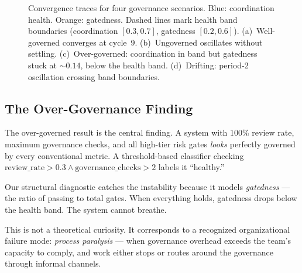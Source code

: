 \documentclass[sigconf,nonacm]{acmart}
\begin{document}
\begin{figure}[t]
  \caption{Convergence traces for four governance scenarios. Blue:
    coordination health. Orange: gatedness. Dashed lines mark health band
    boundaries (coordination $[0.3, 0.7]$, gatedness $[0.2, 0.6]$).
    (a)~Well-governed converges at cycle~9. (b)~Ungoverned oscillates
    without settling. (c)~Over-governed: coordination in band but gatedness
    stuck at ${\sim}0.14$, below the health band. (d)~Drifting: period-2
    oscillation crossing band boundaries.}
  \label{fig:convergence}
\end{figure}


\subsection{The Over-Governance Finding}

The over-governed result is the central finding. A system with 100\%
review rate, maximum governance checks, and all high-tier risk gates
\emph{looks} perfectly governed by every conventional metric. A
threshold-based classifier checking
$\mathrm{review\_rate} > 0.3 \wedge \mathrm{governance\_checks} > 2$
labels it ``healthy.''

Our structural diagnostic catches the instability because it models
\emph{gatedness} --- the ratio of passing to total gates. When everything
holds, gatedness drops below the health band. The system cannot breathe.

This is not a theoretical curiosity. It corresponds to a recognized
organizational failure mode: \emph{process paralysis} --- when governance
overhead exceeds the team's capacity to comply, and work either stops
or routes around the governance through informal channels.
\end{document}
